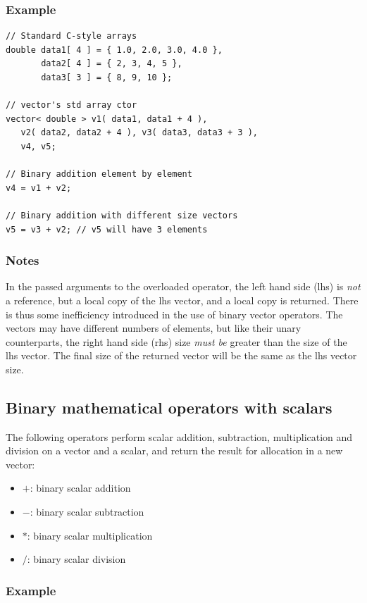 \documentclass{report}
\begin{document}
\subsubsection{Example}

\begin{verbatim}
// Standard C-style arrays
double data1[ 4 ] = { 1.0, 2.0, 3.0, 4.0 },
       data2[ 4 ] = { 2, 3, 4, 5 },
       data3[ 3 ] = { 8, 9, 10 };

// vector's std array ctor
vector< double > v1( data1, data1 + 4 ),
   v2( data2, data2 + 4 ), v3( data3, data3 + 3 ),
   v4, v5;

// Binary addition element by element
v4 = v1 + v2;

// Binary addition with different size vectors
v5 = v3 + v2; // v5 will have 3 elements
\end{verbatim}

\subsubsection{Notes}
In the passed arguments to the overloaded operator, the left hand side
(lhs) is {\em not} a reference, but a local copy of the lhs vector,
and a local copy is returned.  There is thus some inefficiency
introduced in the use of binary vector operators.  The vectors may
have different numbers of elements, but like their unary counterparts,
the right hand side (rhs) size {\em must be} greater than the size of
the lhs vector.  The final size of the returned vector will be the
same as the lhs vector size.

\subsection{Binary mathematical operators with scalars}

The following operators perform scalar addition,
subtraction, multiplication and division on a vector and a scalar, and
return the result for allocation in a new vector:

\begin{itemize}
\item $+$: binary scalar addition
\item $-$: binary scalar subtraction
\item $*$: binary scalar multiplication
\item $/$: binary scalar division
\end{itemize}

\subsubsection{Example}
\end{document}
